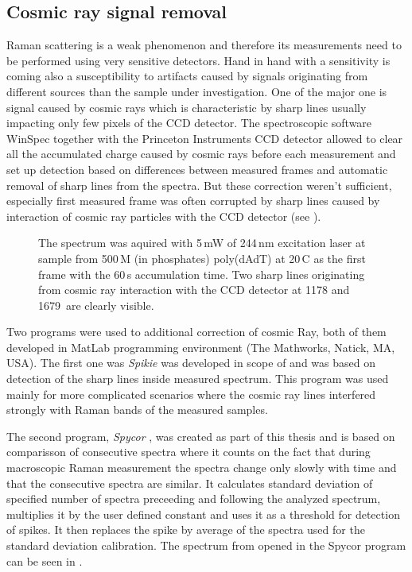 \subsection{Cosmic ray signal removal}
\label{subsec:spike_removal}

Raman scattering is a weak phenomenon and therefore its measurements need to be
performed using very sensitive detectors.
Hand in hand with a sensitivity is coming also a susceptibility to artifacts
caused by signals originating from different sources than the sample under
investigation.
One of the major one is signal caused by cosmic rays which is characteristic
by sharp lines usually impacting only few pixels of the CCD detector.
The spectroscopic software WinSpec together with the Princeton Instruments
CCD detector allowed to clear all the accumulated charge caused by cosmic rays
before each measurement and set up detection based on differences between
measured frames and automatic removal of sharp lines from the spectra.
But these correction weren't sufficient, especially first measured frame
was often corrupted by sharp lines caused by interaction of cosmic ray
particles with the CCD detector
(see ).

\begin{figure}
	\centering
	
	\vspace{3mm}
	\caption[%
		UVRR pectrum containing cosmic ray signal.
	]{%
		The spectrum was aquired with 5\,mW of 244\,nm excitation laser at sample
		from 500\,M (in phosphates) poly(dAdT) at 20\,\textdegree{}C as the
		first frame with the 60\,s accumulation time.
		Two sharp lines originating from cosmic ray interaction with the CCD
		detector at 1178 and 1679\,\icm{} are clearly visible.
	}
	\label{\figlabel{cosmic_spikes:spectrum}}
\end{figure}

Two programs were used to additional correction of cosmic Ray, both of them
developed in MatLab programming environment (The Mathworks, Natick, MA, USA).
The first one was \emph{Spikie}
\parencite{Spikie2011}
was developed in scope of
\textcite{Klener2011}
and was based on detection of the sharp lines inside measured spectrum.
This program was used mainly for more complicated scenarios where the cosmic
ray lines interfered strongly with Raman bands of the measured samples.

The second program, \emph{Spycor}
\parencite{Spycor2018},
was created as part of this thesis and is based on comparisson of consecutive
spectra where it counts on the fact that during macroscopic Raman measurement
the spectra change only slowly with time and that the consecutive spectra are
similar.
It calculates standard deviation of specified number of spectra preceeding and
following the analyzed spectrum, multiplies it by the user defined constant
and uses it as a threshold for detection of spikes.
It then replaces the spike by average of the spectra used for the standard
deviation calibration. The spectrum from
opened in the Spycor program can be seen in
.

